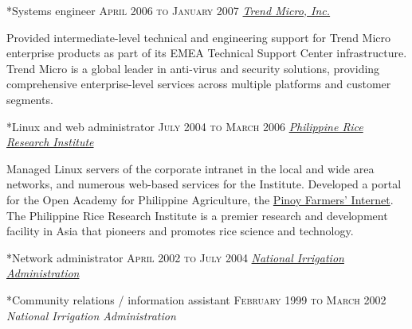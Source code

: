 \documentclass[10pt, a4paper, final]{article}
\begin{document}
\begin{minipage}[t]{0.65\linewidth}
\begin{section}
    \begin{subsection}*{Systems engineer \hfill\textsc{April 2006 to January 2007}}
      \href{http://www.trendmicro.com}{\textit{Trend Micro, Inc.}}  

      Provided intermediate-level technical and engineering support for Trend Micro enterprise products as part of its EMEA Technical Support Center infrastructure. Trend Micro is a global leader in anti-virus and security solutions, providing comprehensive enterprise-level services across multiple platforms and customer segments.
    \end{subsection}
    \vspace{1em}
  
    \begin{subsection}*{Linux and web administrator \hfill\textsc{July 2004 to March 2006}}
      \href{http://www.philrice.gov.ph}{\textit{Philippine Rice Research Institute}}  

      Managed Linux servers of the corporate intranet in the local and wide area networks, and numerous web-based services for the Institute. Developed a portal for the Open Academy for Philippine Agriculture, the \href{http://www.openacademy.ph}{Pinoy Farmers' Internet}. The Philippine Rice Research Institute is a premier research and development facility in Asia that pioneers and promotes rice science and technology.
    \end{subsection}
    \vspace{1em}
  
    \begin{subsection}*{Network administrator \hfill\textsc{April 2002 to July 2004}}
      \href{http://www.nia.gov.ph}{\textit{National Irrigation Administration}}  
    \end{subsection}
    \vspace{1em}
  
    \begin{subsection}*{Community relations / information assistant \hfill\textsc{February 1999 to March 2002}}
      \textit{National Irrigation Administration} 
    \end{subsection}
    \vspace{1em}
  \end{section}
\end{minipage}
\end{document}
